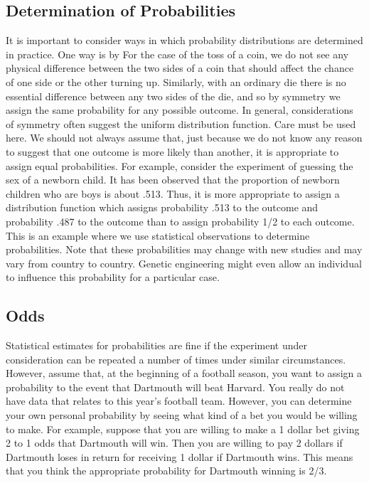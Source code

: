 \subsection*{Determination of Probabilities}

It is important to consider ways in which probability distributions are
determined in practice.  One way is by   For the case of the
toss of a coin, we do not see any physical difference between the two sides
of
a coin that should affect the chance of one side or the other turning up. 
Similarly, with an ordinary die there is no essential difference between any
two sides of the die, and so by symmetry we assign the same probability for
any
possible outcome.  In general, considerations of symmetry often suggest the
uniform distribution function.  Care must be used here.  We should not always assume
that,
just because we do not know any reason to suggest that one outcome is more
likely than another, it is appropriate to assign equal probabilities.  For
example, consider the experiment of guessing the sex of a newborn child.  It
has been observed that the proportion of newborn children who are boys is
about
.513.  Thus, it is more appropriate to assign a distribution function which
assigns probability .513 to the outcome  and probability .487 to
the
outcome  than to assign probability 1/2 to each outcome.  This is
an
example where we use statistical observations to determine probabilities. 
Note
that these probabilities may change with new studies and may vary from
country
to country.  Genetic engineering might even allow an individual to influence
this probability for a particular case.

\subsection*{Odds}

Statistical estimates for probabilities are fine if the experiment under
consideration can be repeated a number of times under similar circumstances. 
However, assume that, at the beginning of a football season, you want to
assign
a probability to the event that Dartmouth will beat Harvard.  
You really do not
have data that relates to this year's football team.  However, you can
determine your own personal probability by seeing what kind of a bet you
would
be willing to make.  For example, suppose that you are willing to make a 1
dollar bet giving 2 to 1 odds that Dartmouth will win.  Then you are willing
to
pay 2 dollars if Dartmouth loses in return for receiving 1 dollar if
Dartmouth
wins.  This means that you think the appropriate probability for Dartmouth
winning is 2/3.

